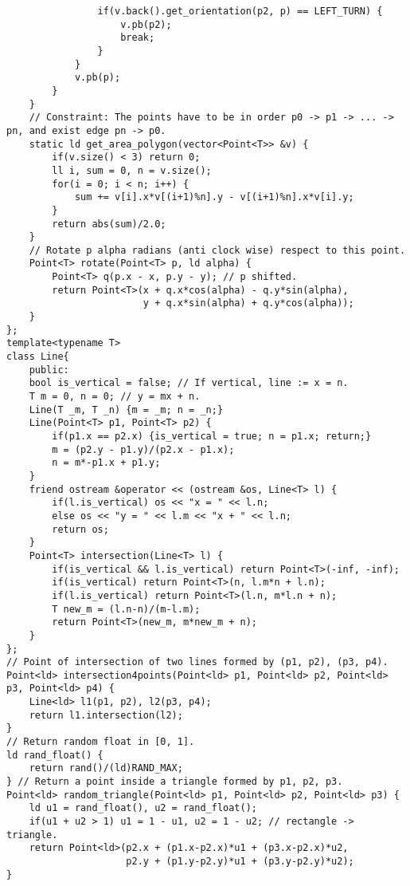 \documentclass[a4paper]{article}
\begin{document}
\begin{multicols}{2}
\begin{verbatim}
                if(v.back().get_orientation(p2, p) == LEFT_TURN) {
                    v.pb(p2);
                    break;
                }
            }
            v.pb(p);
        }
    }
    // Constraint: The points have to be in order p0 -> p1 -> ... -> pn, and exist edge pn -> p0.
    static ld get_area_polygon(vector<Point<T>> &v) {
        if(v.size() < 3) return 0;
        ll i, sum = 0, n = v.size();
        for(i = 0; i < n; i++) {
            sum += v[i].x*v[(i+1)%n].y - v[(i+1)%n].x*v[i].y;
        }
        return abs(sum)/2.0;
    }
    // Rotate p alpha radians (anti clock wise) respect to this point.
    Point<T> rotate(Point<T> p, ld alpha) {
        Point<T> q(p.x - x, p.y - y); // p shifted.
        return Point<T>(x + q.x*cos(alpha) - q.y*sin(alpha),
                        y + q.x*sin(alpha) + q.y*cos(alpha));
    }
};
template<typename T>
class Line{
    public:
    bool is_vertical = false; // If vertical, line := x = n.
    T m = 0, n = 0; // y = mx + n.
    Line(T _m, T _n) {m = _m; n = _n;}
    Line(Point<T> p1, Point<T> p2) {
        if(p1.x == p2.x) {is_vertical = true; n = p1.x; return;}
        m = (p2.y - p1.y)/(p2.x - p1.x);
        n = m*-p1.x + p1.y;
    }
    friend ostream &operator << (ostream &os, Line<T> l) {
        if(l.is_vertical) os << "x = " << l.n;
        else os << "y = " << l.m << "x + " << l.n;
        return os;
    }
    Point<T> intersection(Line<T> l) {
        if(is_vertical && l.is_vertical) return Point<T>(-inf, -inf);
        if(is_vertical) return Point<T>(n, l.m*n + l.n);
        if(l.is_vertical) return Point<T>(l.n, m*l.n + n);
        T new_m = (l.n-n)/(m-l.m);
        return Point<T>(new_m, m*new_m + n);
    }
};
// Point of intersection of two lines formed by (p1, p2), (p3, p4).
Point<ld> intersection4points(Point<ld> p1, Point<ld> p2, Point<ld> p3, Point<ld> p4) {
    Line<ld> l1(p1, p2), l2(p3, p4);
    return l1.intersection(l2);
}
// Return random float in [0, 1].
ld rand_float() {
    return rand()/(ld)RAND_MAX;
} // Return a point inside a triangle formed by p1, p2, p3.
Point<ld> random_triangle(Point<ld> p1, Point<ld> p2, Point<ld> p3) {
    ld u1 = rand_float(), u2 = rand_float();
    if(u1 + u2 > 1) u1 = 1 - u1, u2 = 1 - u2; // rectangle -> triangle.
    return Point<ld>(p2.x + (p1.x-p2.x)*u1 + (p3.x-p2.x)*u2,
                     p2.y + (p1.y-p2.y)*u1 + (p3.y-p2.y)*u2);
}
\end{verbatim}
\end{multicols}
\end{document}
